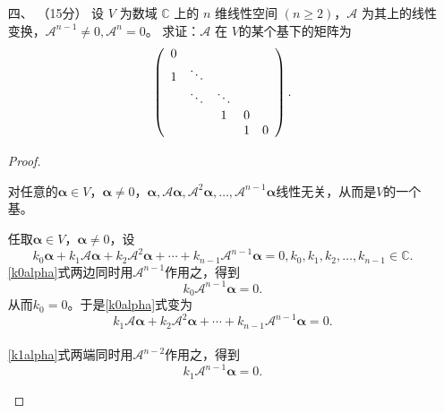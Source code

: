 \begin{enumerate}[1~]
\item[四、]（15分）
设 $V$ 为数域 $\mathbb{C}$ 上的 $n$ 维线性空间 $(n \ge 2)$，$\mathscr{A}$ 为其上的线性变换，$\mathscr{A}^{n-1}\ne 0, \mathscr{A}^{n} = 0$。 求证：$\mathscr{A}$ 在 $V$的某个基下的矩阵为\[
\left( \begin{array} { c c c c c } { 0 } & { } & { } & { } & { } \\ { 1 } & { \ddots } & { } & { } & { } \\ { } & { \ddots } & { \ddots } & { } & { } \\ { } & { } & { 1 } & { 0 } & { } \\ { } & { } & { } & { 1 } & { 0 } \end{array} \right).
\]
\begin{proof}
\begin{lemma}
对任意的$\boldsymbol{\alpha}\in V$，$\boldsymbol{\alpha}\ne0$，$\boldsymbol{\alpha}, \mathscr{A}\boldsymbol{\alpha}, \mathscr{A}^2\boldsymbol{\alpha}, \dotsc, \mathscr{A}^{n-1}\boldsymbol{\alpha}$线性无关，从而是$V$的一个基。
\end{lemma}
\begin{subproof}
任取$\boldsymbol{\alpha}\in V$，$\boldsymbol{\alpha}\ne0$，设
\begin{equation}\label{k0alpha}
k_0\boldsymbol{\alpha}+k_1\mathscr{A}\boldsymbol{\alpha}+k_2\mathscr{A}^2\boldsymbol{\alpha}+\cdots+k_{n-1}\mathscr{A}^{n-1}\boldsymbol{\alpha}=0, k_0, k_1, k_2, \dotsc, k_{n-1}\in \mathbb{C}.
\end{equation}
\ref{k0alpha}式两边同时用$\mathscr{A}^{n-1}$作用之，得到\[
k_0\mathscr{A}^{n-1}\boldsymbol{\alpha}=0.
\]
从而$k_0=0$。于是\ref{k0alpha}式变为\begin{equation}\label{k1alpha}
k_1\mathscr{A}\boldsymbol{\alpha}+k_2\mathscr{A}^2\boldsymbol{\alpha}+\cdots+k_{n-1}\mathscr{A}^{n-1}\boldsymbol{\alpha}=0.
\end{equation}
\\
\ref{k1alpha}式两端同时用$\mathscr{A}^{n-2}$作用之，得到\[
k_1\mathscr{A}^{n-1}\boldsymbol{\alpha}=0.
\]


\end{subproof}
\end{proof}
\end{enumerate}
